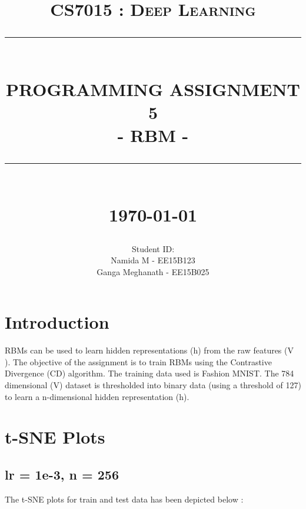 \documentclass[12pt]{report}
\newcommand{\HRule}[1]{\rule{\linewidth}{#1}}
\begin{document}
\title{ \normalsize \textsc{CS7015 : Deep Learning}
		\\ [2.0cm]
		\HRule{0.5pt} \\
		\LARGE \textbf{\uppercase{Programming Assignment 5}}\\
        \large{- RBM -}
		\HRule{2pt} \\ [0.5cm]
		\normalsize \today \vspace*{5\baselineskip}}

\date{}

\author{
		Student ID:  \\ 
		Namida M - EE15B123 \\
		Ganga Meghanath - EE15B025
		}

\renewcommand\thesection{\arabic{section}}
\maketitle
\tableofcontents
\newpage

\sectionfont{\scshape}


\section{Introduction}
RBMs can be used to learn hidden representations (h) from the raw features (V ). The objective of the assignment is to train RBMs using the Contrastive Divergence (CD) algorithm. The training data used is Fashion MNIST. The 784 dimensional (V) dataset is thresholded into binary data (using a threshold of 127) to learn a n-dimensional hidden representation (h).

\section{t-SNE Plots}

\subsection{lr = 1e-3, n = 256}
The t-SNE plots for train and test data has been depicted below :
\end{document}
